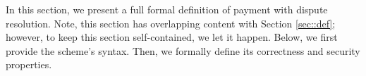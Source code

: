 %
%
%
%
%  
%  
%  
%    
%   
%
%     
%
%
%


In this section, we present a full formal definition of payment with dispute resolution.  Note,  this section  has  overlapping content with  Section \ref{sec::def}; however, to keep this section self-contained,  we let it happen. Below, we first provide the scheme's syntax.  Then, we   formally define its correctness  and security properties. 


